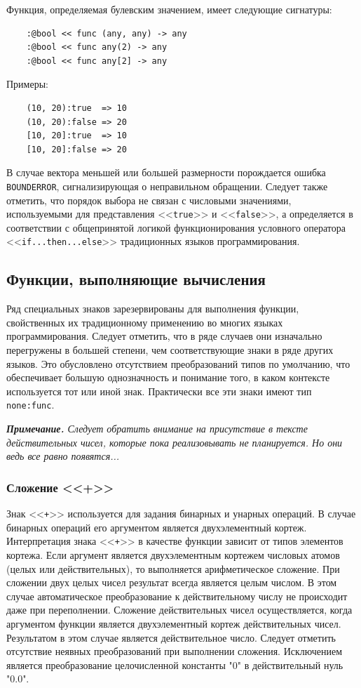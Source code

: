 Функция, определяемая булевским значением, имеет следующие сигнатуры:
\begin{verbatim}
    :@bool << func (any, any) -> any
    :@bool << func any(2) -> any
    :@bool << func any[2] -> any
\end{verbatim}

Примеры:
\begin{verbatim}
    (10, 20):true  => 10
    (10, 20):false => 20
    [10, 20]:true  => 10
    [10, 20]:false => 20
\end{verbatim}

В случае вектора меньшей или большей размерности порождается ошибка \verb|BOUNDERROR|, сигнализирующая о неправильном обращении. Следует также отметить, что порядок выбора не связан с числовыми значениями, используемыми для представления <<\verb|true|>> и <<\verb|false|>>, а определяется в соответствии с общепринятой логикой функционирования условного оператора <<\verb|if...then...else|>> традиционных языков программирования.

\subsection{Функции, выполняющие вычисления}

Ряд специальных знаков зарезервированы для выполнения функции, свойственных их традиционному применению во многих языках программирования. Следует отметить, что в ряде случаев они изначально перегружены в большей степени, чем соответствующие знаки в ряде других языков. Это обусловлено отсутствием преобразований типов по умолчанию, что обеспечивает большую однозначность и понимание того, в каком контексте используется тот или иной знак. Практически все эти знаки имеют тип \verb|none:func|.

\textit{\textbf{Примечание.}
Следует обратить внимание на присутствие в тексте действительных чисел, которые пока реализовывать не планируется. Но они ведь все равно появятся...}

\subsubsection{Сложение <<+>>}

Знак <<\verb|+|>> используется для задания бинарных и унарных операций. В случае бинарных операций его аргументом является двухэлементный кортеж. Интерпретация знака <<\verb|+|>> в качестве функции зависит от типов элементов кортежа. Если аргумент является двухэлементным кортежем числовых атомов (целых или действительных), то выполняется арифметическое сложение. При сложении двух целых чисел результат всегда является целым числом. В этом случае автоматическое преобразование к действительному числу не происходит даже при переполнении. Сложение действительных чисел осуществляется, когда аргументом функции является двухэлементный кортеж действительных чисел. Результатом в этом случае является действительное число. Следует отметить отсутствие неявных преобразований при выполнении сложения. Исключением является преобразование целочисленной константы "0" в действительный нуль "0.0".

